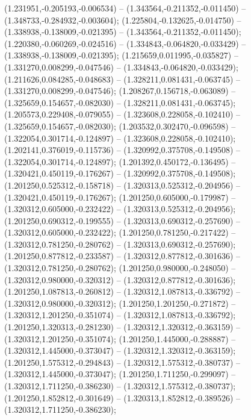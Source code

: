  (1.231951,-0.205193,-0.006534) -- (1.343564,-0.211352,-0.011450) -- (1.348733,-0.284932,-0.003604);
 (1.225804,-0.132625,-0.014750) -- (1.338938,-0.138009,-0.021395) -- (1.343564,-0.211352,-0.011450);
 (1.220380,-0.060269,-0.024516) -- (1.334843,-0.064820,-0.033429) -- (1.338938,-0.138009,-0.021395);
 (1.215659,0.011995,-0.035827) -- (1.331270,0.008299,-0.047546) -- (1.334843,-0.064820,-0.033429);
 (1.211626,0.084285,-0.048683) -- (1.328211,0.081431,-0.063745) -- (1.331270,0.008299,-0.047546);
 (1.208267,0.156718,-0.063089) -- (1.325659,0.154657,-0.082030) -- (1.328211,0.081431,-0.063745);
 (1.205573,0.229408,-0.079055) -- (1.323608,0.228058,-0.102410) -- (1.325659,0.154657,-0.082030);
 (1.203532,0.302470,-0.096598) -- (1.322054,0.301714,-0.124897) -- (1.323608,0.228058,-0.102410);
 (1.202141,0.376019,-0.115736) -- (1.320992,0.375708,-0.149508) -- (1.322054,0.301714,-0.124897);
 (1.201392,0.450172,-0.136495) -- (1.320421,0.450119,-0.176267) -- (1.320992,0.375708,-0.149508);
 (1.201250,0.525312,-0.158718) -- (1.320313,0.525312,-0.204956) -- (1.320421,0.450119,-0.176267);
 (1.201250,0.605000,-0.179987) -- (1.320312,0.605000,-0.232422) -- (1.320313,0.525312,-0.204956);
 (1.201250,0.690312,-0.199555) -- (1.320313,0.690312,-0.257690) -- (1.320312,0.605000,-0.232422);
 (1.201250,0.781250,-0.217422) -- (1.320312,0.781250,-0.280762) -- (1.320313,0.690312,-0.257690);
 (1.201250,0.877812,-0.233587) -- (1.320312,0.877812,-0.301636) -- (1.320312,0.781250,-0.280762);
 (1.201250,0.980000,-0.248050) -- (1.320312,0.980000,-0.320312) -- (1.320312,0.877812,-0.301636);
 (1.201250,1.087813,-0.260812) -- (1.320312,1.087813,-0.336792) -- (1.320312,0.980000,-0.320312);
 (1.201250,1.201250,-0.271872) -- (1.320312,1.201250,-0.351074) -- (1.320312,1.087813,-0.336792);
 (1.201250,1.320313,-0.281230) -- (1.320312,1.320312,-0.363159) -- (1.320312,1.201250,-0.351074);
 (1.201250,1.445000,-0.288887) -- (1.320312,1.445000,-0.373047) -- (1.320312,1.320312,-0.363159);
 (1.201250,1.575312,-0.294843) -- (1.320312,1.575312,-0.380737) -- (1.320312,1.445000,-0.373047);
 (1.201250,1.711250,-0.299097) -- (1.320312,1.711250,-0.386230) -- (1.320312,1.575312,-0.380737);
 (1.201250,1.852812,-0.301649) -- (1.320313,1.852812,-0.389526) -- (1.320312,1.711250,-0.386230);
